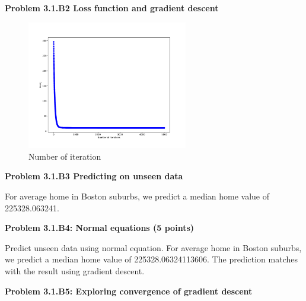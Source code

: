 \documentclass[]{book}
\theoremstyle{definition}
\begin{document}
\textbf{Problem 3.1.B2 Loss function and gradient descent}
\begin{figure}[H]
	\centering
	\includegraphics[width=7cm]{fig5.pdf}
	\caption{Number of iteration}
	\label{fig:4}
\end{figure}

\begin{flushleft}
\textbf{Problem 3.1.B3 Predicting on unseen data}
\end{flushleft}
\begin{flushleft}
	For average home in Boston suburbs, we predict a median home value of 225328.063241.
\end{flushleft}
\textbf{Problem 3.1.B4: Normal equations (5 points)}
\begin{flushleft}
	Predict unseen data using normal equation. For average home in Boston suburbs, we predict a median home value of 225328.06324113606. The prediction matches with the result using gradient descent.

	
\end{flushleft}
\textbf{Problem 3.1.B5: Exploring convergence of gradient descent}
\end{document}
